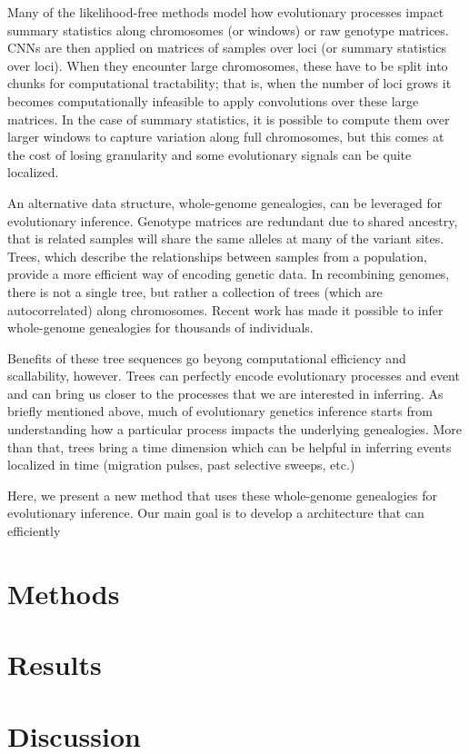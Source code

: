 Many of the likelihood-free methods model how evolutionary processes impact summary statistics along chromosomes (or windows) or raw genotype matrices.
CNNs are then applied on matrices of samples over loci (or summary statistics over loci).
When they encounter large chromosomes, these have to be split into chunks for computational tractability;
that is, when the number of loci grows it becomes computationally infeasible to apply convolutions over these large matrices.
In the case of summary statistics, it is possible to compute them over larger windows to capture variation along full chromosomes,
but this comes at the cost of losing granularity and some evolutionary signals can be quite localized.

An alternative data structure, whole-genome genealogies, can be leveraged for evolutionary inference.
Genotype matrices are redundant due to shared ancestry, that is related samples will share the same alleles at many of the variant sites.
Trees, which describe the relationships between samples from a population, provide a more efficient way of encoding genetic data.
In recombining genomes, there is not a single tree, but rather a collection of trees (which are autocorrelated) along chromosomes.
Recent work has made it possible to infer whole-genome genealogies for thousands of individuals.

Benefits of these tree sequences go beyong computational efficiency and scallability, however.
Trees can perfectly encode evolutionary processes and event and can bring us closer to the processes that we are interested in inferring.
As briefly mentioned above, much of evolutionary genetics inference starts from understanding how a particular process impacts the underlying genealogies.
More than that, trees bring a time dimension which can be helpful in inferring events localized in time (\eg migration pulses, past selective sweeps, etc.)

Here, we present a new method that uses these whole-genome genealogies for evolutionary inference.
Our main goal is to develop a architecture that can efficiently 


\section{Methods} \label{sec:methods}
\section{Results}
\section{Discussion}
